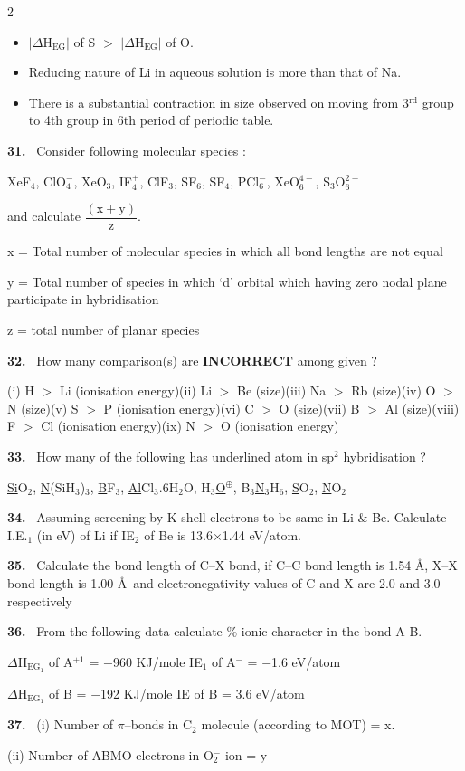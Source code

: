 \documentclass[10pt]{extarticle}
\newcommand{\qn}[1]{\par\smallskip\noindent\textbf{#1.}~}
\newenvironment{qoptions}{\begin{itemize}[leftmargin=1.8em,itemsep=1pt,topsep=2pt,label={}]}{\end{itemize}}
\newcommand{\opt}[2]{\item[(#1)] #2}
\begin{document}
\begin{multicols}{2}
\begin{qoptions}
\opt{B}{$|\Delta$H$_\mathrm{EG}|$ of S $>$ $|\Delta$H$_\mathrm{EG}|$ of O.}
\opt{C}{Reducing nature of Li in aqueous solution is more than that of Na.}
\opt{D}{There is a substantial contraction in size observed on moving from 3$^\mathrm{rd}$ group to 4th group in 6th period of periodic table.}
\end{qoptions}
\qn{31} Consider following molecular species :\par
XeF$_4$, ClO$_4^-$, XeO$_3$, IF$_4^+$, ClF$_3$, SF$_6$, SF$_4$, PCl$_6^-$, XeO$_6^{4-}$, S$_3$O$_6^{2-}$\par
and calculate $\dfrac{(\mathrm x+\mathrm y)}{\mathrm z}$.\par
x = Total number of molecular species in which all bond lengths are not equal\par
y = Total number of species in which `d' orbital which having zero nodal plane participate in hybridisation\par
z = total number of planar species
\qn{32} How many comparison(s) are \textbf{INCORRECT} among given ?\par
(i) H $>$ Li (ionisation energy)\quad (ii) Li $>$ Be (size)\quad (iii) Na $>$ Rb (size)\quad (iv) O $>$ N (size)\quad (v) S $>$ P (ionisation energy)\quad (vi) C $>$ O (size)\quad (vii) B $>$ Al (size)\quad (viii) F $>$ Cl (ionisation energy)\quad (ix) N $>$ O (ionisation energy)
\qn{33} How many of the following has underlined atom in sp$^2$ hybridisation ?\par
\underline{Si}O$_2$, \underline{N}(SiH$_3$)$_3$, \underline{B}F$_3$, \underline{Al}Cl$_3$.6H$_2$O, H$_3$\underline{O}$^\oplus$, B$_3$\underline{N}$_3$H$_6$, \underline{S}O$_2$, \underline{N}O$_2$
\qn{34} Assuming screening by K shell electrons to be same in Li \& Be. Calculate I.E.$_1$ (in eV) of Li if IE$_2$ of Be is 13.6$\times$1.44 eV/atom.
\qn{35} Calculate the bond length of C--X bond, if C--C bond length is 1.54 \AA, X--X bond length is 1.00 \AA\ and electronegativity values of C and X are 2.0 and 3.0 respectively
\qn{36} From the following data calculate \% ionic character in the bond A-B.\par
[1 eV/atom = 96 KJ/mole]\par
$\Delta$H$_{\mathrm{EG}_1}$ of A$^{+1}$ = $-$960 KJ/mole \hfill IE$_1$ of A$^-$ = $-$1.6 eV/atom\par
$\Delta$H$_{\mathrm{EG}_1}$ of B = $-$192 KJ/mole \hfill IE of B = 3.6 eV/atom
\qn{37} (i) Number of $\pi$--bonds in C$_2$ molecule (according to MOT) = x.\par
(ii) Number of ABMO electrons in O$_2^-$ ion = y\par

\end{multicols}
\end{document}
